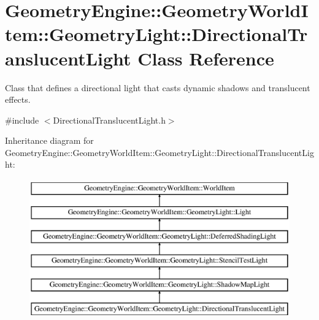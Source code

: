 \hypertarget{class_geometry_engine_1_1_geometry_world_item_1_1_geometry_light_1_1_directional_translucent_light}{}\section{Geometry\+Engine\+::Geometry\+World\+Item\+::Geometry\+Light\+::Directional\+Translucent\+Light Class Reference}
\label{class_geometry_engine_1_1_geometry_world_item_1_1_geometry_light_1_1_directional_translucent_light}


Class that defines a directional light that casts dynamic shadows and translucent effects.  




{\ttfamily \#include $<$Directional\+Translucent\+Light.\+h$>$}

Inheritance diagram for Geometry\+Engine\+::Geometry\+World\+Item\+::Geometry\+Light\+::Directional\+Translucent\+Light\+:\begin{figure}[H]
\begin{center}
\leavevmode
\includegraphics[height=6.000000cm]{class_geometry_engine_1_1_geometry_world_item_1_1_geometry_light_1_1_directional_translucent_light}
\end{center}
\end{figure}
